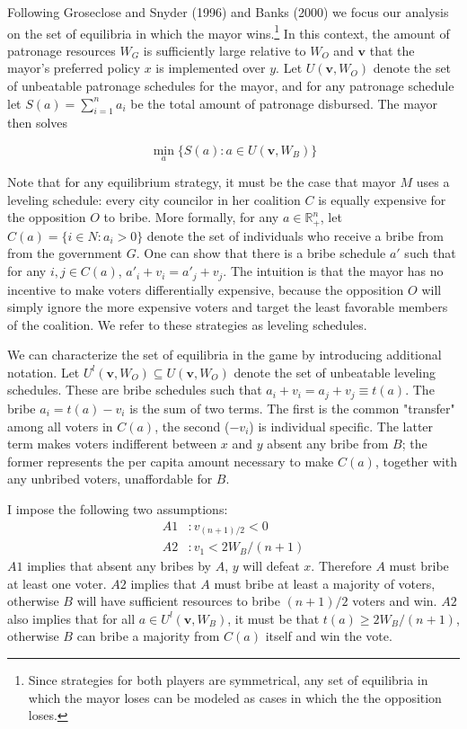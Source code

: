 \documentclass[12pt,a4paper]{article}
\newcommand{\bfv}{\mathbf{v}}
\begin{document}
Following Groseclose and Snyder (1996) and Banks (2000) we focus our analysis on the set of equilibria in which the mayor wins.\footnote{Since strategies for both players are symmetrical, any set of equilibria in which the mayor loses can be modeled as cases in which the the opposition loses.} In this context, the amount of patronage resources $W_G$ is sufficiently large relative to $W_O$ and $\bfv$ that the mayor's preferred policy $x$ is implemented over $y$. Let $U(\bfv, W_O)$ denote the set of unbeatable patronage schedules for the mayor, and for any patronage schedule let $S(a) = \sum_{i = 1}^n a_i$ be the total amount of patronage disbursed. The mayor then solves

\begin{equation}
    \label{eqn:solution}
    \min_a\{S(a) : a \in U(\mathbf{v}, W_B) \}
\end{equation}

Note that for any equilibrium strategy, it must be the case that mayor $M$ uses a leveling schedule: every city councilor in her coalition $C$ is equally expensive for the opposition $O$ to bribe. More formally, for any $a \in \mathbb{R}_+^n$, let $C(a) = \{i \in N : a_i > 0\}$ denote the set of individuals who receive a bribe from from the government $G$. One can show that there is a bribe schedule $a'$ such that for any $i,j \in C(a)$, $a'_i + v_i = a'_j + v_j$. The intuition is that the mayor has no incentive to make voters differentially expensive, because the opposition $O$ will simply ignore the more expensive voters and target the least favorable members of the coalition. We refer to these strategies as leveling schedules.

We can characterize the set of equilibria in the game by introducing additional notation. Let $U^l(\mathbf{v}, W_O) \subseteq U(\mathbf{v}, W_O)$ denote the set of unbeatable leveling schedules. These are bribe schedules such that $a_i + v_i = a_j + v_j  \equiv t(a)$. The bribe $a_i = t(a) - v_i$ is the sum of two terms. The first is the common "transfer" among all voters in $C(a)$, the second ($-v_i$) is individual specific. The latter term makes voters indifferent between $x$ and $y$ absent any bribe from $B$; the former represents the per capita amount necessary to make $C(a)$, together with any unbribed voters, unaffordable for $B$.

I impose the following two assumptions:
\begin{align*}
    A1 &: v_{(n+1)/2} < 0\\
    A2 &: v_1 < 2W_B/(n+1) 
\end{align*}
$A1$ implies that absent any bribes by $A$, $y$ will defeat $x$. Therefore $A$ must bribe at least one voter. $A2$ implies that $A$ must bribe at least a majority of voters, otherwise $B$ will have sufficient resources to bribe $(n+1)/2$ voters and win. $A2$ also implies that for all $a \in U^l(\mathbf{v}, W_B)$, it must be that $t(a) \geq 2W_B/(n + 1)$, otherwise $B$ can bribe a majority from $C(a)$ itself and win the vote.
\end{document}
